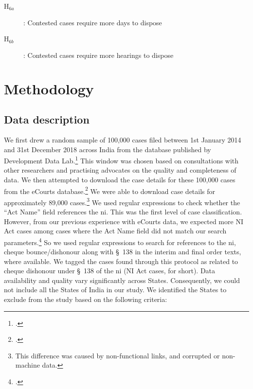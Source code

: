 \documentclass[12pt,a4paper]{article}
\begin{document}
\begin{description}
\item[H$_{6a}$]: Contested cases require more days to dispose
\item[H$_{6b}$]: Contested cases require more hearings to dispose
\end{description}

\section{Methodology}
\label{sec:methodology}
\subsection{Data description} \label{sec:data-description}

We first drew a random sample of 100,000 cases filed between 1st January 2014 and 31st December 2018 across India from the database published by Development Data Lab.\footcite{devdatalabs2021_eCourtsData} This window was chosen based on consultations with other researchers and practising advocates on the quality and completeness of data. We then attempted to download the case details for these 100,000 cases from the eCourts database.\footcite{ecourts2022} We were able to download case details for approximately 89,000 cases.\footnote{This difference was caused by non-functional links, and corrupted or non-machine data.} We used regular expressions to check whether the ``Act Name'' field references the \gls{ni}. This was the first level of case classification. However, from our previous experience with eCourts data, we expected more NI Act cases among cases where the Act Name field did not match our search parameters.\footcite[The Act Name field sometimes does not contain the name of the substantive act, but rather the name of the procedural Act (e.g., CrPC) or, in rare cases, the subject matter of the case. This is mainly because case classification and nomenclature practices vary from state-to-state. However, in rare cases, the field is not populated or contains erroneous information. For details, please see,][]{damle2020_ecourtsData} So we used regular expressions to search for references to the \gls{ni}, cheque bounce/dishonour along with \S~138 in the interim and final order texts, where available. We tagged the cases found through this protocol as related to cheque dishonour under \S~138 of the \gls{ni} (NI Act cases, for short). Data availability and quality vary significantly across States. Consequently, we could not include all the States of India in our study. We identified the States to exclude from the study based on the following criteria:
\end{document}

